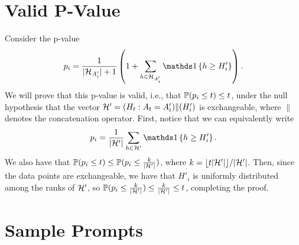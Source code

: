 \documentclass{article}
\begin{document}
\section{Valid P-Value}
\label{app:p-val}
Consider the p-value
\begin{equation}
    p_i = \frac{1}{|\cH_{A'_i}|+1} \left(1 + \sum\limits_{h \in \cH_{A'_i}} \ind{h \geq H'_i}\right).
\end{equation}
We will prove that this p-value is valid, i.e., that $\P(p_i \leq t) \leq t$, under the null hypothesis that the vector $\cH' = (H_t : A_t = A'_i)\|(H'_i)$ is exchangeable, where $\|$ denotes the concatenation operator.
First, notice that we can equivalently write
\begin{equation}
    p_i = \frac{1}{|\cH'|} \sum\limits_{h \in \cH'} \ind{h \geq H'_i}.
\end{equation}
We also have that $\P(p_i \leq t) \leq \P(p_i \leq \frac{k}{|\cH'|})$, where $k = \lfloor t|\cH'| \rfloor /|\cH'|$.
Then, since the data points are exchangeable, we have that $H'_i$ is uniformly distributed among the ranks of $\cH'$, so $ \P(p_i \leq \frac{k}{|\cH'|}) \leq \frac{k}{|\cH'|} \leq t$, completing the proof.

\newpage
\lstset{
    basicstyle=\ttfamily,
    breaklines=true
}
\section{Sample Prompts}
\label{app:sample-prompts}
\end{document}
